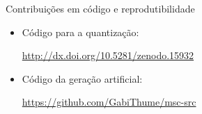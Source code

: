 \documentclass{beamer}
\begin{document}
\begin{frame}{Contribuições em código e reprodutibilidade}
  \setlength\leftmargini{1em}
  \justifying
  \begin{itemize}
    \item Código para a quantização:
    \begin{center}
      \small{\url{http://dx.doi.org/10.5281/zenodo.15932}}
    \end{center}
    \item Código da geração artificial:
    \begin{center}
      \small{\url{https://github.com/GabiThume/msc-src}}
    \end{center}
  \end{itemize}
\end{frame}
\end{document}
